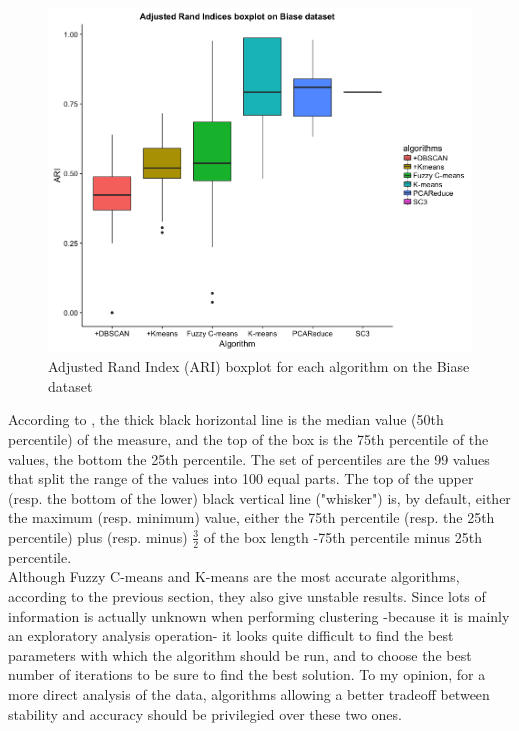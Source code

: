 \documentclass{report}
\begin{document}
{\begin{figure}[H]
\centering
\includegraphics[scale=0.4]{benchmark/boxplotStability.png}
\caption{Adjusted Rand Index (ARI) boxplot for each algorithm on the Biase dataset}
\label{allBoxplotARI}
\end{figure}

According to \cite{boxplot}, the thick black horizontal line is the median value (50th percentile) of the measure, and the top of the box is the 75th percentile of the values, the bottom the 25th percentile. The set of percentiles are the 99 values that split the range of the values into 100 equal parts. The top of the upper (resp. the bottom of the lower) black vertical line ("whisker") is, by default, either the maximum (resp. minimum) value, either the 75th percentile (resp. the 25th percentile) plus (resp. minus) $\frac{3}{2}$ of the box length -75th percentile minus 25th percentile.\\

Although Fuzzy C-means and K-means are the most accurate algorithms, according to the previous section, they also give unstable results. Since lots of information is actually unknown when performing clustering -because it is mainly an exploratory analysis operation- it looks quite difficult to find the best parameters with which the algorithm should be run, and to choose the best number of iterations to be sure to find the best solution. To my opinion, for a more direct analysis of the data, algorithms allowing a better tradeoff between stability and accuracy should be privilegied over these two ones.\\

}
\end{document}
